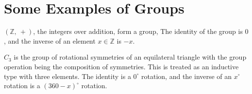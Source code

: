 \section{Some Examples of Groups}

\begin{definition}
    \label{definition : Int}
    \leanok
    $(\mathbb{Z},~ +)$, the integers over addition, form a group, The identity
    of the group is $0$, and the inverse of an element
    $x \in \mathbb{Z}$ is $-x$.
\end{definition}

\begin{definition}[$C_3$]
    \label{definition : C3}
    \leanok
    $C_3$ is the group of rotational symmetries of an equilateral triangle with
    the group operation being the composition of symmetries.
    This is treated as an inductive type with three elements. The
    identity is a $ 0 ^{\circ} $ rotation, and the inverse of an  $x ^{\circ} $
    rotation is a $(360 - x)^{\circ} $ rotation.
\end{definition}
